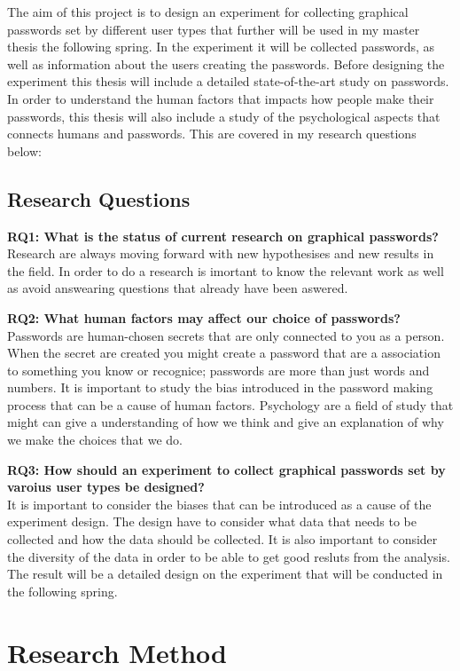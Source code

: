 The aim of this project is to design an experiment for collecting graphical passwords set by different user types that further will be used in my master thesis the following spring. In the experiment it will be collected passwords, as well as information about the users creating the passwords. Before designing the experiment this thesis will include a detailed state-of-the-art study on passwords. In order to understand the human factors that impacts how people make their passwords, this thesis will also include a study of the psychological aspects that connects humans and passwords. This are covered in my research questions below:

  \subsection*{Research Questions}

    {\bf RQ1: What is the status of current research on graphical passwords? } \\
    Research are always moving forward with new hypothesises and new results in the field. In order to do a research is imortant to know the relevant work as well as avoid answearing questions that already have been aswered.
    
    {\bf RQ2: What human factors may affect our choice of passwords?} \\
    Passwords are human-chosen secrets that are only connected to you as a person. When the secret are created you might create a password that are a association to something you know or recognice; passwords are more than just words and numbers. It is important to study the bias introduced in the password making process that can be a cause of human factors. Psychology are a field of study that might can give a understanding of how we think and give an explanation of why we make the choices that we do. 
    
    {\bf RQ3: How should an experiment to collect graphical passwords set by varoius user types be designed?} \\
    It is important to consider the biases that can be introduced as a cause of the experiment design. The design have to consider what data that needs to be collected and how the data should be collected. It is also important to consider the diversity of the data in order to be able to get good resluts from the analysis. The result will be a detailed design on the experiment that will be conducted in the following spring. 

\section{Research Method}  

